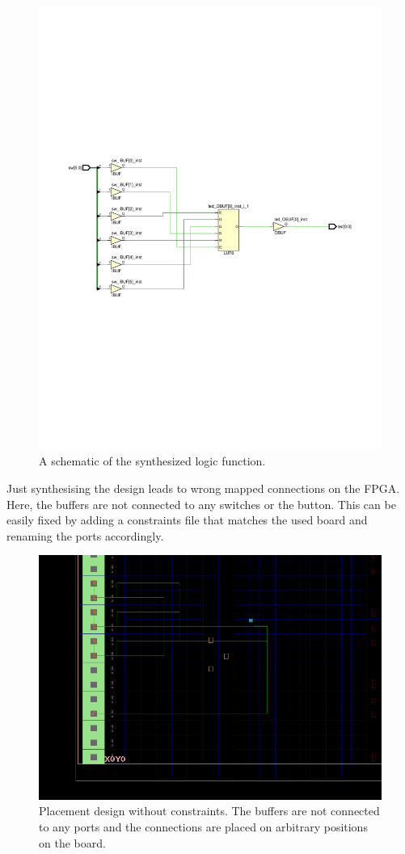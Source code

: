 \begin{figure}
	\centering
	\includegraphics[width=\linewidth, trim=0mm 90mm 0mm 90mm]{./L1/E2/schematic.pdf}
	\caption{A schematic of the synthesized logic function.}
	\label{fig: schematic e_1_2_3}
\end{figure}

Just synthesising the design leads to wrong mapped connections on the FPGA. Here, the buffers are not connected to any switches or the button. This can be easily fixed by adding a constraints file that matches the used board and renaming the ports accordingly.

\begin{figure}
	\centering
	\includegraphics[width=.8\linewidth]{./L1/E2/step5}
	\caption{Placement design without constraints. The buffers are not connected to any ports and the connections are placed on arbitrary positions on the board.}
	\label{fig: placement without constraints e_1_2_4}
\end{figure}

